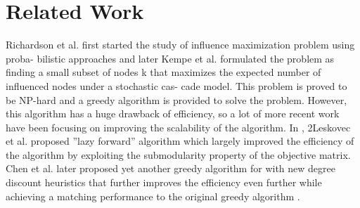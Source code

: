 \section{Related Work}
Richardson et al. \cite{Baroni1984} first started the study of influence maximization problem using proba-
bilistic approaches and later Kempe et al. formulated the problem as finding a small subset
of nodes k that maximizes the expected number of influenced nodes under a stochastic cas-
cade model. This problem is proved to be NP-hard and a greedy algorithm is provided to
solve the problem. However, this algorithm has a huge drawback of efficiency, so a lot of
more recent work have been focusing on improving the scalability of the algorithm. In \cite{Baroni1985},
2Leskovec et al. proposed ”lazy forward” algorithm which largely improved the efficiency of
the algorithm by exploiting the submodularity property of the objective matrix. Chen et al.
\cite{Baroni1986} later proposed yet another greedy algorithm for with new degree discount heuristics that
further improves the efficiency even further while achieving a matching performance to the
original greedy algorithm \cite{Baroni1987}.